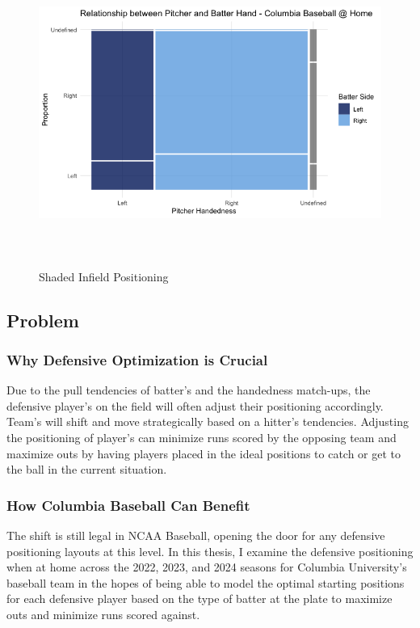 \documentclass{article}
\begin{document}
\vspace{1.5cm}
\begin{figure}[h]
    \centering        
    \includegraphics[height=10cm]{images/columbia_handedness.png}
    \caption{Shaded Infield Positioning}
\end{figure}
\vspace{1.5cm}

\newpage
\subsection{Problem}
\subsubsection{Why Defensive Optimization is Crucial}
Due to the pull tendencies of batter's and the handedness match-ups, the defensive player's on the field will often adjust their positioning accordingly. Team's will shift and move strategically based on a hitter's tendencies. Adjusting the positioning of player's can minimize runs scored by the opposing team and maximize outs by having players placed in the ideal positions to catch or get to the ball in the current situation. 

\subsubsection{How Columbia Baseball Can Benefit}
The shift is still legal in NCAA Baseball, opening the door for any defensive positioning layouts at this level. In this thesis, I examine the defensive positioning when at home across the 2022, 2023, and 2024 seasons for Columbia University's baseball team in the hopes of being able to model the optimal starting positions for each defensive player based on the type of batter at the plate to maximize outs and minimize runs scored against. 
\end{document}
